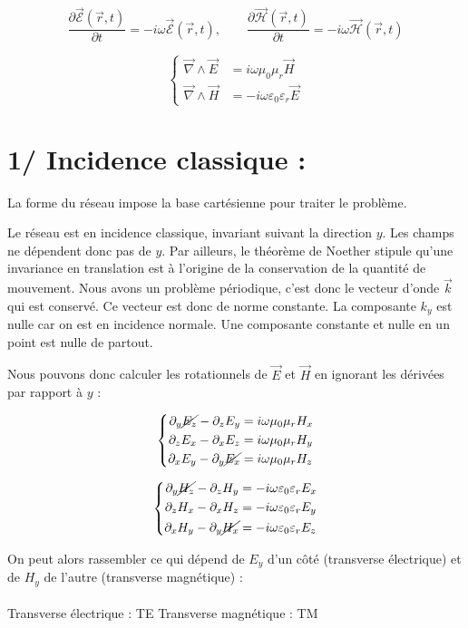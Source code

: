 \documentclass{article}
\begin{document}
\[
\frac{\partial \vec{\mathcal{E}}(\vec{r}, t)}{\partial t} = -i \omega \vec{\mathcal{E}}(\vec{r}, t), \qquad
\frac{\partial \vec{\mathcal{H}}(\vec{r}, t)}{\partial t} = -i \omega \vec{\mathcal{H}}(\vec{r}, t)
\]

\[
\left\{
\begin{aligned}
\vec{\nabla} \wedge \vec{E} &= i \omega \mu_0 \mu_r \vec{H} \\
\vec{\nabla} \wedge \vec{H} &= - i \omega \varepsilon_0 \varepsilon_r \vec{E}
\end{aligned}
\right.
\]
\section*{1/ Incidence classique : }
La forme du réseau impose la base cartésienne pour traiter le problème.

Le réseau est en incidence classique, invariant suivant la direction \(y\). Les champs ne dépendent donc pas de \(y\). Par ailleurs, le théorème de Noether stipule qu'une invariance en translation est à l'origine de la conservation de la quantité de mouvement. Nous avons un problème périodique, c'est donc le vecteur d'onde \(\vec{k}\) qui est conservé. Ce vecteur est donc de norme constante. La composante \(k_y\) est nulle car on est en incidence normale. Une composante constante et nulle en un point est nulle de partout.

Nous pouvons donc calculer les rotationnels de \(\vec{E}\) et \(\vec{H}\) en ignorant les dérivées par rapport à \(y\) :

\[
\left\{
\begin{aligned}
\partial_y \cancel{E_z} - \partial_z E_y &= i \omega \mu_0 \mu_r H_x \\
\partial_z E_x - \partial_x E_z &= i \omega \mu_0 \mu_r H_y \\
\partial_x E_y - \partial_y \cancel{E_x} &= i \omega \mu_0 \mu_r H_z
\end{aligned}
\right.
\]

\[
\left\{
\begin{aligned}
\partial_y \cancel{H_z} - \partial_z H_y &= -i \omega \varepsilon_0 \varepsilon_r E_x \\
\partial_z H_x - \partial_x H_z &= -i \omega \varepsilon_0 \varepsilon_r E_y \\
\partial_x H_y - \partial_y \cancel{H_x} &= -i \omega \varepsilon_0 \varepsilon_r E_z
\end{aligned}
\right.
\]

On peut alors rassembler ce qui dépend de \(E_y\) d'un côté (transverse électrique) et de \(H_y\) de l'autre (transverse magnétique) : 
\\ \\
{Transverse électrique : TE} \hfill {Transverse magnétique : TM}
\end{document}
